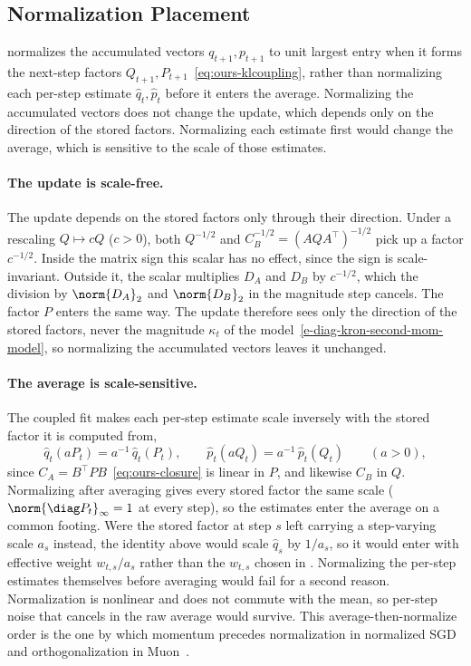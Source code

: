 \subsection{Normalization Placement}
\label{sec:scale-placement}
\methodname{} normalizes the accumulated vectors $q_{t+1},p_{t+1}$ to unit
largest entry when it forms the next-step factors
$Q_{t+1},P_{t+1}$~\eqref{eq:ours-klcoupling}, rather than normalizing each
per-step estimate $\hat{q}_t,\hat{p}_t$ before it enters the average.
Normalizing the accumulated vectors does not change the update, which
depends only on the direction of the stored factors. Normalizing each
estimate first would change the average, which is sensitive to the scale
of those estimates.

\paragraph{The update is scale-free.} The update depends on the stored
factors only through their direction. Under a rescaling $Q\mapsto cQ$
($c>0$), both $Q^{-1/2}$ and $C_B^{-1/2}=(AQA^\top)^{-1/2}$ pick up a
factor $c^{-1/2}$. Inside the matrix sign this scalar has no effect, since
the sign is scale-invariant. Outside it, the scalar multiplies $D_A$ and
$D_B$ by $c^{-1/2}$, which the division by $\norm{D_A}_2$ and
$\norm{D_B}_2$ in the magnitude step cancels. The factor $P$ enters the
same way. The update therefore sees only the direction of the stored
factors, never the magnitude $\kappa_t$ of the
model~\eqref{e-diag-kron-second-mom-model}, so normalizing the accumulated
vectors leaves it unchanged.

\paragraph{The average is scale-sensitive.} The coupled fit makes each
per-step estimate scale inversely with the stored factor it is computed
from,
\[
  \hat{q}_t(aP_t)=a^{-1}\,\hat{q}_t(P_t),
  \qquad
  \hat{p}_t(aQ_t)=a^{-1}\,\hat{p}_t(Q_t)
  \qquad(a>0),
\]
since $C_A=B^\top PB$~\eqref{eq:ours-closure} is linear in $P$, and
likewise $C_B$ in $Q$. Normalizing after
averaging gives every stored factor the same scale
($\norm{\diag P_t}_\infty=1$ at every step), so the estimates enter the
average on a common footing. Were the stored factor at step $s$ left carrying a step-varying scale
$a_s$ instead, the identity above would scale
$\hat{q}_s$ by $1/a_s$, so it would enter with effective weight
$w_{t,s}/a_s$ rather than the $w_{t,s}$ chosen in .
Normalizing the per-step estimates themselves before averaging would fail
for a second reason. Normalization is nonlinear and does not commute with
the mean, so per-step noise that cancels in the raw average would survive.
This average-then-normalize order is the one by which momentum precedes
normalization in normalized SGD~\cite{cutkosky_nigt} and orthogonalization
in Muon~\cite{denoise_ortho}.

